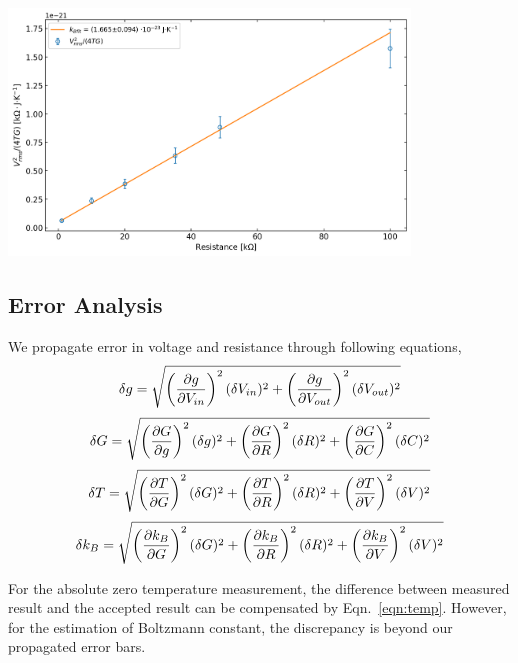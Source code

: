 \documentclass[12pt]{article}
\begin{document}
\begin{center}
    \includegraphics[width=0.8\textwidth]{images/nitro_fit.png}
    \label{fig:boltzConst}
\end{center}

\subsection{Error Analysis}
\quad We propagate error in voltage and resistance through following equations,
\begin{equation}
    \delta g = \sqrt{\left(\pdv{g}{V_{in}} \right)^2 (\delta V_{in})^2 + \left(\pdv{g}{V_{out}} \right)^2 (\delta V_{out})^2 } 
\end{equation}
\begin{equation}
    \delta G = \sqrt{\left(\pdv{G}{g} \right)^2 (\delta g)^2 + \left(\pdv{G}{R} \right)^2 (\delta R)^2  + \left(\pdv{G}{C} \right)^2 (\delta C)^2  }
\end{equation}
\begin{equation}
    \delta T = \sqrt{\left(\pdv{T}{G} \right)^2 (\delta G)^2 + \left(\pdv{T}{R} \right)^2 (\delta R)^2 + \left(\pdv{T}{V} \right)^2 (\delta V)^2} \label{eqn:temp}
\end{equation}
\begin{equation}
    \delta k_B = \sqrt{\left(\pdv{k_B}{G} \right)^2 (\delta G)^2 + \left(\pdv{k_B}{R} \right)^2 (\delta R)^2 + \left(\pdv{k_B}{V} \right)^2 (\delta V)^2}\label{eqn:therm}
\end{equation}

For the absolute zero temperature measurement, the difference between measured result and the accepted result can be compensated by Eqn.~\ref{eqn:temp}. However, for the estimation of Boltzmann constant, the discrepancy is beyond our propagated error bars. 
\end{document}
